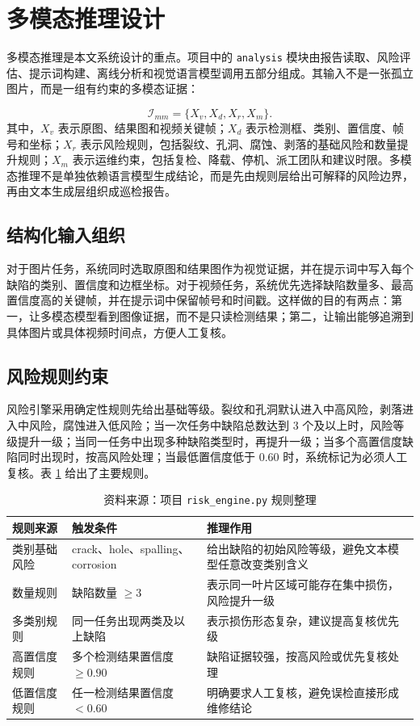 \documentclass[UTF8,zihao=-4,a4paper]{ctexrep}
\newcommand{\code}[1]{\texttt{#1}}
\newcommand{\tablesource}[1]{\vspace{-0.4em}\caption*{\footnotesize 资料来源：#1}}
\begin{document}
\section{多模态推理设计}
多模态推理是本文系统设计的重点。项目中的 \code{analysis} 模块由报告读取、风险评估、提示词构建、离线分析和视觉语言模型调用五部分组成。其输入不是一张孤立图片，而是一组有约束的多模态证据：

\begin{equation}
  \mathcal{I}_{mm}=\{X_v,X_d,X_r,X_m\}.
\end{equation}
其中，$X_v$ 表示原图、结果图和视频关键帧；$X_d$ 表示检测框、类别、置信度、帧号和坐标；$X_r$ 表示风险规则，包括裂纹、孔洞、腐蚀、剥落的基础风险和数量提升规则；$X_m$ 表示运维约束，包括复检、降载、停机、派工团队和建议时限。多模态推理不是单独依赖语言模型生成结论，而是先由规则层给出可解释的风险边界，再由文本生成层组织成巡检报告。

\subsection{结构化输入组织}
对于图片任务，系统同时选取原图和结果图作为视觉证据，并在提示词中写入每个缺陷的类别、置信度和边框坐标。对于视频任务，系统优先选择缺陷数量多、最高置信度高的关键帧，并在提示词中保留帧号和时间戳。这样做的目的有两点：第一，让多模态模型看到图像证据，而不是只读检测结果；第二，让输出能够追溯到具体图片或具体视频时间点，方便人工复核。

\subsection{风险规则约束}
风险引擎采用确定性规则先给出基础等级。裂纹和孔洞默认进入中高风险，剥落进入中风险，腐蚀进入低风险；当一次任务中缺陷总数达到 3 个及以上时，风险等级提升一级；当同一任务中出现多种缺陷类型时，再提升一级；当多个高置信度缺陷同时出现时，按高风险处理；当最低置信度低于 0.60 时，系统标记为必须人工复核。表 \ref{tab:risk_rules} 给出了主要规则。

\begin{table}[H]
  \centering
  \caption{多模态推理中的风险规则约束}
  \label{tab:risk_rules}
  \small
  \begin{tabularx}{\textwidth}{l l X}
    \toprule
    规则来源 & 触发条件 & 推理作用 \\
    \midrule
    类别基础风险 & crack、hole、spalling、corrosion & 给出缺陷的初始风险等级，避免文本模型任意改变类别含义 \\
    数量规则 & 缺陷数量 $\ge 3$ & 表示同一叶片区域可能存在集中损伤，风险提升一级 \\
    多类别规则 & 同一任务出现两类及以上缺陷 & 表示损伤形态复杂，建议提高复核优先级 \\
    高置信度规则 & 多个检测结果置信度 $\ge 0.90$ & 缺陷证据较强，按高风险或优先复核处理 \\
    低置信度规则 & 任一检测结果置信度 $<0.60$ & 明确要求人工复核，避免误检直接形成维修结论 \\
    \bottomrule
  \end{tabularx}
  \tablesource{项目 \code{risk\_engine.py} 规则整理}
\end{table}
\end{document}
